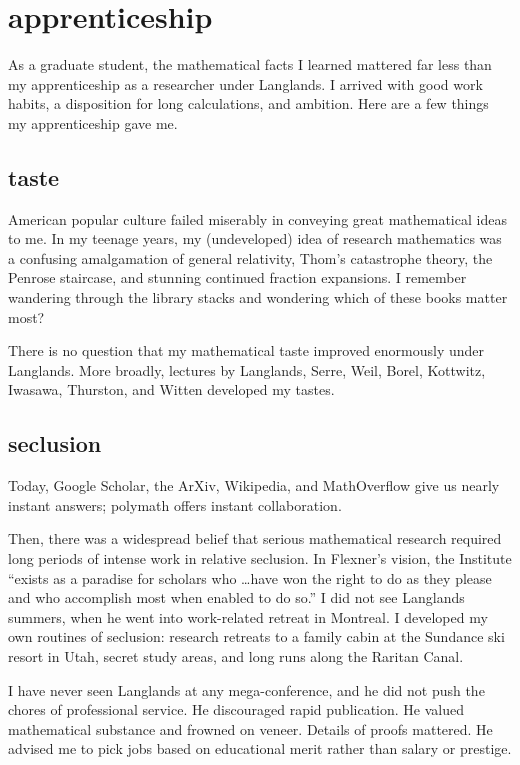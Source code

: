 \section{apprenticeship}

As a graduate student, the mathematical facts I learned mattered far
less than my apprenticeship as a researcher under Langlands.  I
arrived with good work habits, a disposition for long calculations,
and ambition.  Here are a few things my apprenticeship gave me.

\subsection{taste}
American popular culture failed miserably in conveying
great mathematical ideas to me.  In my teenage years, my (undeveloped)
idea of research mathematics was a confusing amalgamation of general
relativity, Thom's catastrophe theory, the Penrose staircase, and
stunning continued fraction expansions.  I remember wandering through
the library stacks and wondering which of these books matter most?

There is no question that my mathematical taste improved enormously
under Langlands. More broadly, lectures by Langlands, Serre, Weil,
Borel, Kottwitz, Iwasawa, Thurston, and Witten developed my tastes.

\subsection{seclusion}

Today, Google Scholar, the ArXiv, Wikipedia, and MathOverflow give us
nearly instant answers; polymath offers instant collaboration.

Then, there was a widespread belief that serious mathematical research
required long periods of intense work in relative seclusion.  In
Flexner's vision, the Institute ``exists as a paradise for scholars
who \ldots have won the right to do as they please and who accomplish
most when enabled to do so.''  I did not see Langlands summers, when
he went into work-related retreat in Montreal.  I developed my own
routines of seclusion: research retreats to a family cabin at the
Sundance ski resort in Utah, secret study areas, and long runs along
the Raritan Canal.

I have never seen Langlands at any mega-conference, and he did not
push the chores of professional service.  He discouraged rapid
publication.  He valued mathematical substance and frowned on veneer.
Details of proofs mattered.  He advised me to pick jobs based on
educational merit rather than salary or prestige.

